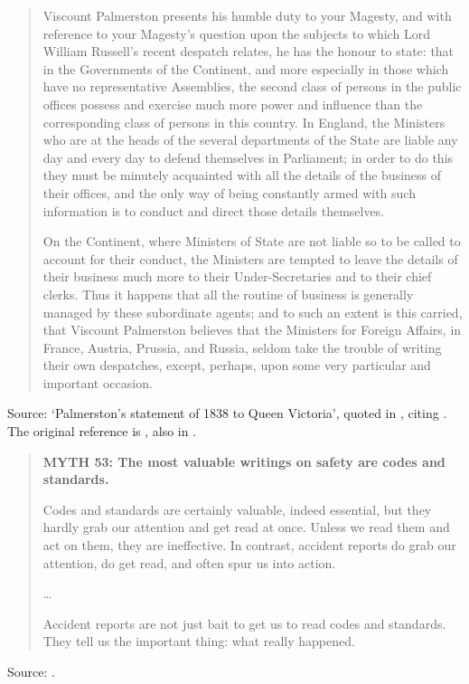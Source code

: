 \documentclass[a4paper]{article}
\begin{document}
\begin{quote}
	Viscount Palmerston presents his humble duty to your Magesty, and with reference to your
Magesty's question upon the subjects to which Lord William Russell's recent despatch relates, he
has the honour to state: that in the Governments of the Continent, and more especially in those
which have no representative Assemblies, the second class of persons in the public offices possess
and exercise much more power and influence than the corresponding class of persons in this country.
In England, the Ministers who are at the heads of the several departments of the State are liable
any day and every day to defend themselves in Parliament; in order to do this they must be minutely
acquainted with all the details of the business of their offices, and the only way of being
constantly armed with such information is to conduct and direct those details themselves.

On the Continent, where Ministers of State are not liable so to be called to account for their
conduct, the Ministers are tempted to leave the details of their business much more to their
Under-Secretaries and to their chief clerks.  Thus it happens that all the routine of business is
generally managed by these subordinate agents; and to such an extent is this carried, that Viscount
Palmerston believes that the Ministers for Foreign Affairs, in France, Austria, Prussia, and Russia,
seldom take the trouble of writing their own despatches, except, perhaps, upon some very particular
and important occasion.
\end{quote}
Source: `Palmerston's statement of 1838 to Queen Victoria', quoted in \citet[p.~140]{Kletz1996},
citing \citet[p.~353]{Jones1978}.  The original reference is \citet[p.~322]{Hanham1969}, also in
\citet[p.~120, Letter from Viscount Palmerston to Queen Victoria, 25th February 1838]{Benson2009}.
\medskip

\begin{quote}
	\textbf{MYTH 53: The most valuable writings on safety are codes and standards.}

	Codes and standards are certainly valuable, indeed essential, but they hardly grab our
attention and get read at once.  Unless we read them and act on them, they are ineffective.  In
contrast, accident reports do grab our attention, do get read, and often spur us into action.

\ldots

Accident reports are not just bait to get us to read codes and standards.  They tell us the
important thing: what really happened.
\end{quote}
Source: \citet[pp.~110--111]{Kletz1996}.
\medskip
\end{document}
